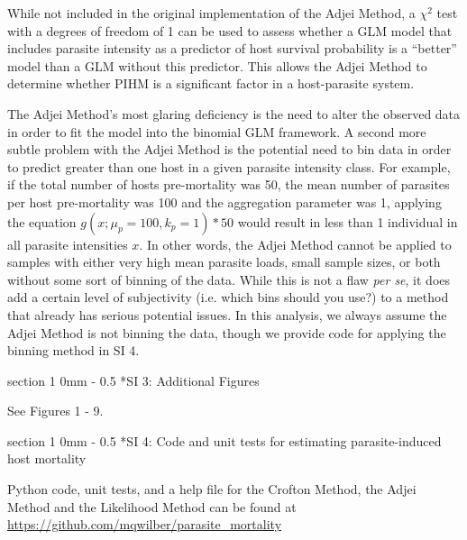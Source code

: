 \documentclass[12pt, a4paper]{article}
\makeatletter
\renewcommand{\section}{\@startsection
{section}%
{1}%
{0mm}%
{-\baselineskip}%
{0.5\baselineskip}%
{\normalfont\bf\large}} %
\makeatother
\begin{document}
While not included in the original implementation of the Adjei Method, a
$\chi^2$ test with a degrees of freedom of 1 can be used to assess whether a GLM model that includes parasite
intensity as a predictor of host survival probability is a ``better'' model than a
GLM without this predictor.  This allows the Adjei Method to determine whether
PIHM is a significant factor in a host-parasite system.

The Adjei Method's most glaring deficiency is the need to alter the observed
data in order to fit the model into the binomial GLM framework.  A second more
subtle problem with the Adjei Method is the potential need to bin data in order
to predict greater than one host in a given parasite intensity class.  For
example, if the total number of hosts pre-mortality was 50, the mean number of
parasites per host pre-mortality was 100 and the aggregation parameter was 1, applying the equation $g(x ; \mu_p=100, k_p=1) * 50$ would result in
less than 1 individual in all parasite intensities $x$. In other words, the
Adjei Method cannot be applied to samples with either very high mean parasite
loads, small sample sizes, or both without some sort of binning of the data.
While this is not a flaw \emph{per se}, it does add a certain level of
subjectivity (i.e. which bins should you use?) to a method that already has
serious potential issues.  In this analysis, we always assume the Adjei Method is not binning the data, though we provide code for applying the binning method in SI 4.


\section*{SI 3: Additional Figures}

See Figures 1 - 9.

\section*{SI 4: Code and unit tests for estimating parasite-induced host mortality}

Python code, unit tests, and a help file for the Crofton Method, the Adjei Method and the Likelihood Method can be found at \url{https://github.com/mqwilber/parasite_mortality}


\singlespacing


\end{document}
